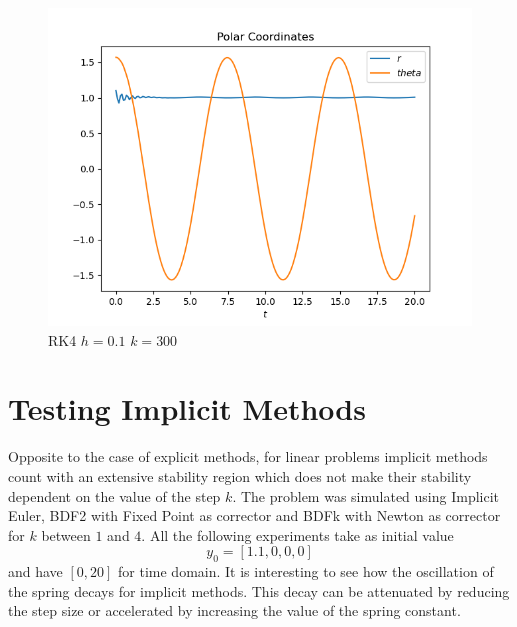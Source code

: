 \documentclass{report}
\newcounter{constant}
\begin{document}
\begin{figure}[h]
\centering
\begin{minipage}[b]{0.45\textwidth}
\centering
\includegraphics[width=\textwidth]{../Plots/RK4/rk4_h=0.1_k=300_c}
\caption{RK4 $h=0.1$ $k=300$}
\label{rk4_h=0.1_k=300_c}
\end{minipage}
\end{figure}

\section*{Testing Implicit Methods}

Opposite to the case of explicit methods, for linear problems implicit methods count with an extensive stability region which does not make their stability dependent on the value of the step $k$.
The problem was simulated using Implicit Euler, BDF2 with Fixed Point as corrector and BDFk with Newton as corrector for $k$ between $1$ and $4$. All the following experiments take as initial value $$y_0 = [1.1, 0, 0, 0]$$ and have $[0, 20]$ for time domain.
It is interesting to see how the oscillation of the spring decays for implicit methods. This decay can be attenuated by reducing the step size or accelerated by increasing the value of the spring constant.
\end{document}

